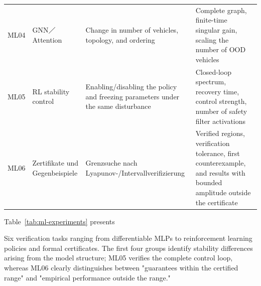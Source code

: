 \documentclass[11pt,a4paper,openany]{book}
\numberwithin{equation}{chapter}
\numberwithin{figure}{chapter}
\numberwithin{table}{chapter}
\newcommand{\tabletext}[2]{%
  \par\smallskip\noindent
  Table~\ref{#1} presents #2
\par\smallskip
}
\begin{document}
\begin{center}
\begin{tabular}{p{1.0cm}p{2.9cm}p{4.0cm}p{5.1cm}}
\\
ML04 & GNN／Attention &






Change in number of vehicles, topology, and ordering






&






Complete graph, finite-time singular gain, scaling the number of OOD vehicles

\\
ML05 &

RL stability control






&






Enabling/disabling the policy and freezing parameters under the same disturbance






&






Closed-loop spectrum, recovery time, control strength, number of safety filter activations






\\
ML06 &




 Zertifikate und Gegenbeispiele




&




Grenzsuche nach Lyapunov-/Intervallverifizierung




&






Verified regions, verification tolerance, first counterexample, and results with bounded amplitude outside the certificate






\\
\bottomrule
\end{tabular}
\end{center}
\tabletext{tab:ml-experiments}{






Six verification tasks ranging from differentiable MLPs to reinforcement learning policies and formal certificates. The first four groups identify stability differences arising from the model structure; ML05 verifies the complete control loop, whereas ML06 clearly distinguishes between "guarantees within the certified range" and "empirical performance outside the range."


}
\end{document}
